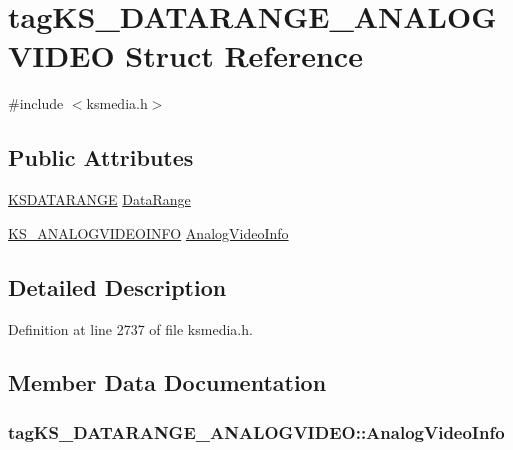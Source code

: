 \hypertarget{structtag_k_s___d_a_t_a_r_a_n_g_e___a_n_a_l_o_g_v_i_d_e_o}{}\section{tag\+K\+S\+\_\+\+D\+A\+T\+A\+R\+A\+N\+G\+E\+\_\+\+A\+N\+A\+L\+O\+G\+V\+I\+D\+EO Struct Reference}
\label{structtag_k_s___d_a_t_a_r_a_n_g_e___a_n_a_l_o_g_v_i_d_e_o}


{\ttfamily \#include $<$ksmedia.\+h$>$}

\subsection*{Public Attributes}
\begin{DoxyCompactItemize}
\item 
\hyperlink{ks_8h_a1ea8bc535eaf96036403dc325623b469}{K\+S\+D\+A\+T\+A\+R\+A\+N\+GE} \hyperlink{structtag_k_s___d_a_t_a_r_a_n_g_e___a_n_a_l_o_g_v_i_d_e_o_ac4af119aa2fbf1fd1065f5b5fd92e190}{Data\+Range}
\item 
\hyperlink{ksmedia_8h_ad56dc49ea9a4886289e20779190a4e4e}{K\+S\+\_\+\+A\+N\+A\+L\+O\+G\+V\+I\+D\+E\+O\+I\+N\+FO} \hyperlink{structtag_k_s___d_a_t_a_r_a_n_g_e___a_n_a_l_o_g_v_i_d_e_o_ad8ee15a679e32f1d22d279c20b5b32e8}{Analog\+Video\+Info}
\end{DoxyCompactItemize}


\subsection{Detailed Description}


Definition at line 2737 of file ksmedia.\+h.



\subsection{Member Data Documentation}
\subsubsection[{\texorpdfstring{Analog\+Video\+Info}{AnalogVideoInfo}}]{ tag\+K\+S\+\_\+\+D\+A\+T\+A\+R\+A\+N\+G\+E\+\_\+\+A\+N\+A\+L\+O\+G\+V\+I\+D\+E\+O\+::\+Analog\+Video\+Info}\hypertarget{structtag_k_s___d_a_t_a_r_a_n_g_e___a_n_a_l_o_g_v_i_d_e_o_ad8ee15a679e32f1d22d279c20b5b32e8}{}\label{structtag_k_s___d_a_t_a_r_a_n_g_e___a_n_a_l_o_g_v_i_d_e_o_ad8ee15a679e32f1d22d279c20b5b32e8}


